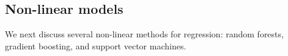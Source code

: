 \documentclass{article}
\begin{document}
	\subsection{Non-linear models}
	We next discuss several non-linear methods for regression: random forests, gradient boosting, and support vector machines.
	

	
\end{document}
